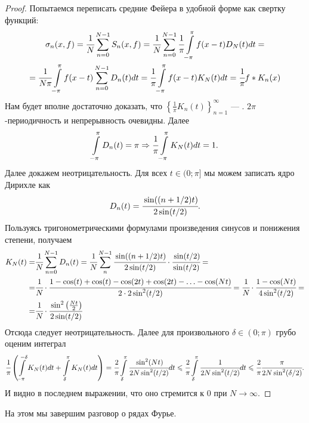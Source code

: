 	\begin{proof}
		Попытаемся переписать средние Фейера в удобной форме как свертку функций:
        \begin{multline}	
			\sigma_n(x,f) = \cfrac{1}{N}\sum\limits_{n=0}^{N-1}S_n(x,f) = \cfrac{1}{N}\sum\limits_{n=0}^{N-1}\cfrac{1}{\pi}\int\limits_{-\pi}^{\pi}f(x-t)D_N(t)dt = \\ 
            = \cfrac{1}{N\pi}\int\limits_{-\pi}^{\pi}f(x-t)\sum\limits_{n=0}^{N-1}D_n(t)dt =   \cfrac{1}{\pi}\int\limits_{-\pi}^{\pi}f(x-t)K_N(t)dt = \cfrac{1}{\pi}f*K_n(x)
        \end{multline}
		Нам будет вполне достаточно доказать, что $\left\{\frac{1}{\pi}K_n(t)\right\}_{n=1}^{\infty}$ --- \lmao. 
		$2\pi$-периодичность и непрерывность очевидны. Далее
		$$
			\int\limits_{-\pi}^{\pi}D_n(t) = \pi \Rightarrow \cfrac{1}{\pi} \int\limits_{-\pi}^{\pi}K_N(t) dt = 1.
		$$
		Далее докажем неотрицательность. Для всех $t \in (0; \pi]$ мы можем записать ядро Дирихле как
		$$
			D_n(t) = \cfrac{\sin((n + 1/2)t)}{2\sin(t/2)}.
		$$
		Пользуясь тригонометрическими формулами произведения синусов и понижения степени, получаем
		\begin{align}
			K_N(t) =& \cfrac{1}{N}\sum\limits_{n=0}^{N-1} D_n(t) = \cfrac{1}{N}\sum\limits_{n}^{N-1} \cfrac{\sin((n + 1/2)t)}{2\sin(t/2)}\cdot\cfrac{\sin(t/2)}{\sin(t/2)} = \\
			=& \cfrac{1}{N}\cdot \cfrac{1 - \cos(t) + \cos(t) - \cos(2t) + \cos(2t) - \ldots - \cos(Nt)}{2\cdot 2\sin^2(t/2)} = \cfrac{1}{N}\cdot \cfrac{1 - \cos(Nt)}{4\sin^2(t/2)} =\\
			=&\cfrac{1}{N}\cdot \cfrac{\sin^2\left(\frac{Nt}{2}\right)}{2\sin(t/2)}
	    \end{align}
	    Отсюда следует неотрицательность.
	    Далее для произвольного $\delta \in (0;\pi)$ грубо оценим интеграл
	    \begin{gather}
	    	\cfrac{1}{\pi}\left(\int\limits_{-\pi}^{-\delta}K_N(t)dt + \int\limits_{\delta}^{\pi}K_N(t)dt\right) = \cfrac{2}{\pi}\int\limits_{\delta}^{\pi}\cfrac{\sin^2(Nt)}{2N\sin^2(t/2)}dt \leqslant \cfrac{2}{\pi}\int\limits_{\delta}^{\pi} \cfrac{1}{2N\sin^2(t/2)}dt \leqslant \cfrac{2}{\pi}\cfrac{\pi}{2N \sin^2(\delta/2)}.
	    \end{gather}
	    И видно в последнем выражении, что оно стремится к 0 при $N \to \infty.$
	\end{proof}
	На этом мы завершим разговор о рядах Фурье.
